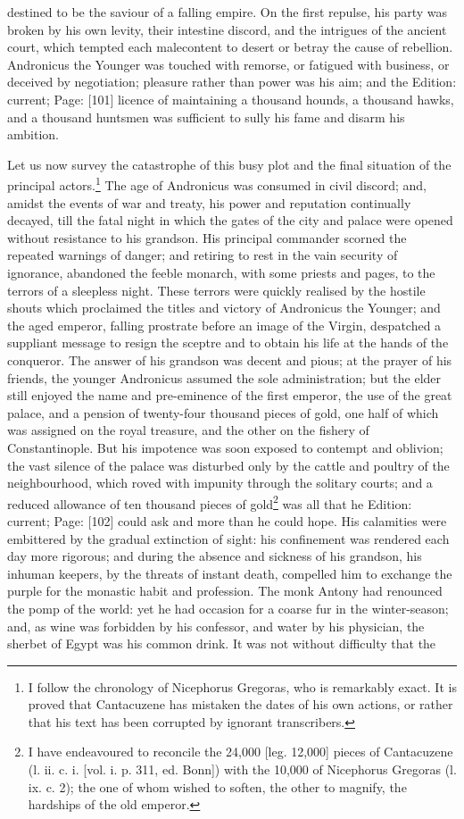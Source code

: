 destined to be the saviour of a falling empire. On the first repulse, his party was broken by his own levity, their intestine discord, and the intrigues of the ancient court, which tempted each malecontent to desert or betray the cause of rebellion. Andronicus the Younger was touched with remorse, or fatigued with business, or deceived by negotiation; pleasure rather than power was his aim; and the Edition: current; Page: [101] licence of maintaining a thousand hounds, a thousand hawks, and a thousand huntsmen was sufficient to sully his fame and disarm his ambition.

Let us now survey the catastrophe of this busy plot and the final situation of the principal actors.\footnote{I follow the chronology of Nicephorus Gregoras, who is remarkably exact. It is proved that Cantacuzene has mistaken the dates of his own actions, or rather that his text has been corrupted by ignorant transcribers.} The age of Andronicus was consumed in civil discord; and, amidst the events of war and treaty, his power and reputation continually decayed, till the fatal night in which the gates of the city and palace were opened without resistance to his grandson. His principal commander scorned the repeated warnings of danger; and retiring to rest in the vain security of ignorance, abandoned the feeble monarch, with some priests and pages, to the terrors of a sleepless night. These terrors were quickly realised by the hostile shouts which proclaimed the titles and victory of Andronicus the Younger; and the aged emperor, falling prostrate before an image of the Virgin, despatched a suppliant message to resign the sceptre and to obtain his life at the hands of the conqueror. The answer of his grandson was decent and pious; at the prayer of his friends, the younger Andronicus assumed the sole administration; but the elder still enjoyed the name and pre-eminence of the first emperor, the use of the great palace, and a pension of twenty-four thousand pieces of gold, one half of which was assigned on the royal treasure, and the other on the fishery of Constantinople. But his impotence was soon exposed to contempt and oblivion; the vast silence of the palace was disturbed only by the cattle and poultry of the neighbourhood, which roved with impunity through the solitary courts; and a reduced allowance of ten thousand pieces of gold\footnote{I have endeavoured to reconcile the 24,000 [leg. 12,000] pieces of Cantacuzene (l. ii. c. i. [vol. i. p. 311, ed. Bonn]) with the 10,000 of Nicephorus Gregoras (l. ix. c. 2); the one of whom wished to soften, the other to magnify, the hardships of the old emperor.} was all that he Edition: current; Page: [102] could ask and more than he could hope. His calamities were embittered by the gradual extinction of sight: his confinement was rendered each day more rigorous; and during the absence and sickness of his grandson, his inhuman keepers, by the threats of instant death, compelled him to exchange the purple for the monastic habit and profession. The monk Antony had renounced the pomp of the world: yet he had occasion for a coarse fur in the winter-season; and, as wine was forbidden by his confessor, and water by his physician, the sherbet of Egypt was his common drink. It was not without difficulty that the 